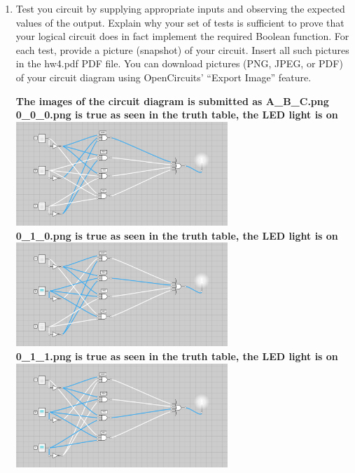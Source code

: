 \documentclass{article}
\begin{document}
\begin{enumerate}
\begin{center}
        \end{center}
        \item Test you circuit by supplying appropriate inputs and observing the expected values of the
        output. Explain why your set of tests is sufficient to prove that your logical circuit does in
        fact implement the required Boolean function. For each test, provide a picture (snapshot) of
        your circuit. Insert all such pictures in the hw4.pdf PDF file. You can download pictures
        (PNG, JPEG, or PDF) of your circuit diagram using OpenCircuits’ “Export Image” feature.
        \begin{center}
            \textbf{The images of the circuit diagram is submitted as A\_B\_C.png}\\[0.25in]
            
            \textbf{0\_0\_0.png is true as seen in the truth table, the LED light is on}\\
            \includegraphics[width=80mm]{circuits/0_0_0.png}\\[0.25in]

            \textbf{0\_1\_0.png is true as seen in the truth table, the LED light is on}\\
            \includegraphics[width=80mm]{circuits/0_1_0.png}\\[0.25in]

            \textbf{0\_1\_1.png is true as seen in the truth table, the LED light is on}\\
            \includegraphics[width=80mm]{circuits/0_1_1.png}\\[0.25in]


\end{center}
\end{enumerate}
\end{document}
